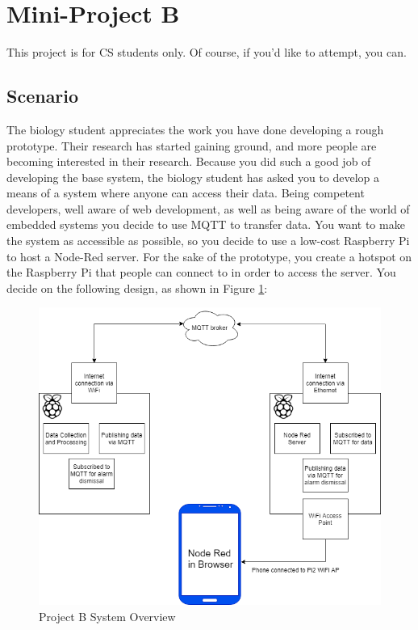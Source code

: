 \section{Mini-Project B}
This project is for CS students only. Of course, if you'd like to attempt, you can.\\

\subsection{Scenario}
The biology student appreciates the work you have done developing a rough prototype. Their research has started gaining ground, and more people are becoming interested in their research. Because you did such a good job of developing the base system, the biology student has asked you to develop a means of a system where anyone can access their data. Being competent developers, well aware of web development, as well as being aware of the world of embedded systems you decide to use MQTT to transfer data. You want to make the system as accessible as possible, so you decide to use a low-cost Raspberry Pi to host a Node-Red server. For the sake of the prototype, you create a hotspot on the Raspberry Pi that people can connect to in order to access the server. You decide on the following design, as shown in Figure \ref{fig:NodeRed}:

\begin{figure}[H]
\centering
\includegraphics[width=1\columnwidth]{Figures/NodeRed}
\caption{Project B System Overview}
\label{fig:NodeRed}
\end{figure}


